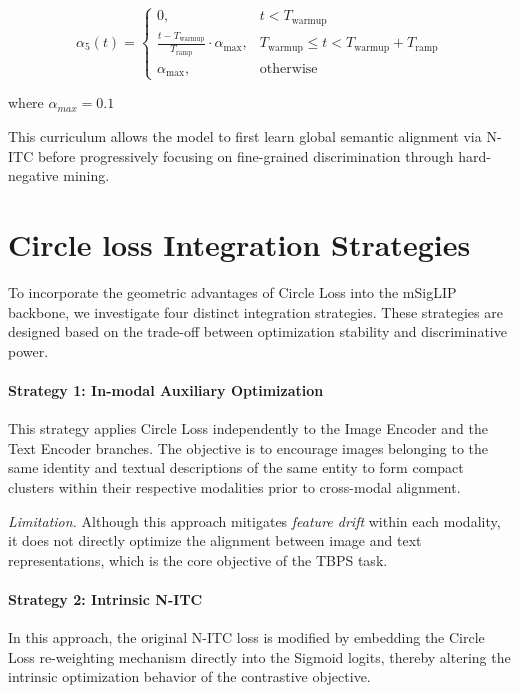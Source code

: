 \documentclass[../main.tex]{subfiles}
\begin{document}
\begin{equation}
    \alpha_5(t) = 
    \begin{cases} 
        0, & t < T_{\text{warmup}} \\
        \frac{t - T_{\text{warmup}}}{T_{\text{ramp}}} \cdot \alpha_{\text{max}}, & T_{\text{warmup}} \le t < T_{\text{warmup}} + T_{\text{ramp}} \\
        \alpha_{\text{max}}, & \text{otherwise}
    \end{cases}
\end{equation}

\noindent where $\alpha_{max} = 0.1$

\vspace{0.5cm}

\noindent This curriculum allows the model to first learn global semantic alignment via N-ITC before progressively focusing on fine-grained discrimination through hard-negative mining.

\section{Circle loss Integration Strategies}

To incorporate the geometric advantages of Circle Loss into the mSigLIP backbone, we investigate four distinct integration strategies. These strategies are designed based on the trade-off between optimization stability and discriminative power.

\paragraph{Strategy 1: In-modal Auxiliary Optimization}
This strategy applies Circle Loss independently to the Image Encoder and the Text Encoder branches. The objective is to encourage images belonging to the same identity and textual descriptions of the same entity to form compact clusters within their respective modalities prior to cross-modal alignment.

\textit{Limitation.} Although this approach mitigates \emph{feature drift} within each modality, it does not directly optimize the alignment between image and text representations, which is the core objective of the TBPS task.

\paragraph{Strategy 2: Intrinsic N-ITC}
In this approach, the original N-ITC loss is modified by embedding the Circle Loss re-weighting mechanism directly into the Sigmoid logits, thereby altering the intrinsic optimization behavior of the contrastive objective.
\end{document}
